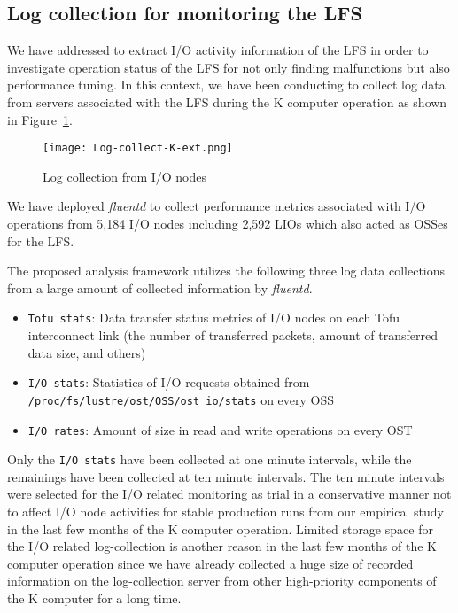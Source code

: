 \documentclass{jhps}
\begin{document}
\subsection{Log collection for monitoring the LFS}
\label{ssec:LOG_COLL_MON}

We have addressed to extract I/O activity information of the LFS
in order to investigate operation status of the LFS
for not only finding malfunctions but also performance tuning.
In this context, we have been conducting to collect log data from servers
associated with the LFS during the K computer operation
as shown in Figure~\ref{fig:Log-collect-K}.
%
\begin{figure}[tb]
\centering
\texttt{[image: Log-collect-K-ext.png]}
\caption{Log collection from I/O nodes}
\label{fig:Log-collect-K}
\end{figure}
We have deployed {\itshape fluentd} to collect performance metrics associated with
I/O operations from 5,184 I/O nodes including 2,592 LIOs which also acted as OSSes
for the LFS.


The proposed analysis framework utilizes the following three log data collections
from a large amount of collected information by {\itshape fluentd}.
%
\begin{itemize}
\item {\tt Tofu stats}: Data transfer status metrics of I/O nodes on each Tofu interconnect link
(the number of transferred packets, amount of transferred data size, and others)
\item {\tt I/O stats}: Statistics of I/O requests obtained from
{\tt /proc/fs/lustre/ost/OSS/ost io/stats} on every OSS
\item {\tt I/O rates}: Amount of size in read and write operations on every OST
\end{itemize}
%
Only the {\tt I/O stats} have been collected at one minute intervals,
while the remainings have been collected at ten minute intervals.
The ten minute intervals were selected for the I/O related monitoring as trial
in a conservative manner not to affect I/O node activities for stable production runs
from our empirical study in the last few months of the K computer operation.
Limited storage space for the I/O related log-collection is another reason
in the last few months of the K computer operation since we have already collected
a huge size of recorded information on the log-collection server
from other high-priority components of the K computer for a long time.
\end{document}
